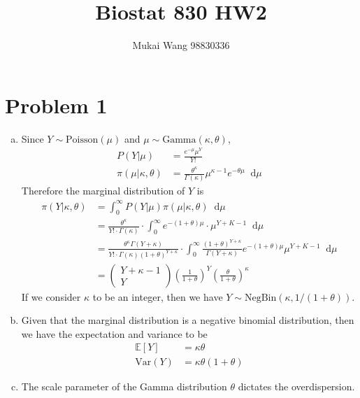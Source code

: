 \documentclass[12pt]{article}
\title{Biostat 830 HW2}
\date{}
\author{Mukai Wang 98830336}
\newcommand*\diff{\mathop{}\!\mathrm{d}}
\begin{document}
\maketitle

\section*{Problem 1}

\begin{enumerate}[(a)]
	\item Since $Y\sim \text{Poisson}(\mu)$ and $\mu \sim \text{Gamma}(\kappa, \theta)$, 
	\begin{align*}
	P\left(\left.Y \right\vert\mu \right)& = \frac{e^{-\mu} \mu^{Y}}{Y!}\\
	\pi\left(\left.\mu \right\vert \kappa, \theta\right) &= \frac{\theta^{\kappa}}{\Gamma(\kappa)}\mu^{\kappa - 1}e^{-\theta\mu}\diff \mu 
	\end{align*}
	Therefore the marginal distribution of $Y$ is
	\begin{align*}
		\pi\left(\left.Y\right\vert\kappa, \theta \right)&= \int_{0}^{\infty} P\left(\left.Y \right\vert\mu \right) \pi\left(\left.\mu \right\vert \kappa, \theta\right)\diff \mu\\
		&=\frac{\theta^{\kappa}}{Y!\cdot \Gamma(\kappa)}\cdot \int_{0}^{\infty}e^{-(1+\theta)\mu} \cdot \mu^{Y+K-1}\diff \mu \\
		&=\frac{\theta^{\kappa} \Gamma(Y+\kappa)}{Y! \cdot \Gamma(\kappa) \left(1+\theta\right)^{Y+\kappa} }\cdot \int_{0}^{\infty} \frac{(1+\theta)^{Y+\kappa}}{\Gamma(Y+\kappa)}e^{-(1+\theta)\mu}\mu^{Y+K-1}\diff \mu\\
		&=\begin{pmatrix}Y+\kappa - 1 \\ Y\end{pmatrix}\left(\frac{1}{1+\theta}\right)^{Y}\left(\frac{\theta}{1+\theta}\right)^{\kappa}
	\end{align*}
	If we consider $\kappa$ to be an integer, then we have $Y \sim \text{NegBin}(\kappa, 1/(1+\theta))$.
	\item Given that the marginal distribution is a negative binomial distribution, then we have the expectation and variance to be
	\begin{align*}
		\mathbb{E}[Y] &= \kappa\theta\\
		\text{Var}(Y) &= \kappa\theta(1+\theta)
	\end{align*}
	\item The scale parameter of the Gamma distribution $\theta$ dictates the overdispersion.
\end{enumerate}
 
\end{document}
